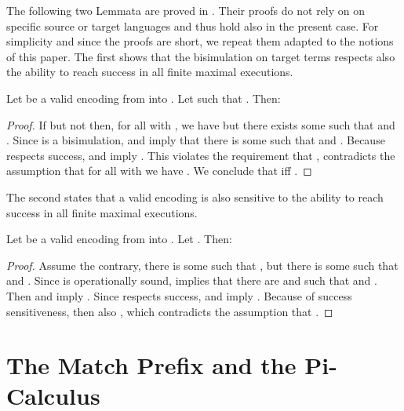 \documentclass[]{article}
\begin{document}
The following two Lemmata are proved in \cite{petphd}. Their proofs do not rely on on specific source or target languages and thus hold also in the present case. For simplicity and since the proofs are short, we repeat them adapted to the notions of this paper. The first shows that the bisimulation  on target terms respects also the ability to reach success in all finite maximal executions.

\begin{lemma}
	\label{lem:mustSuccessRespecting}
	Let \encod be a valid encoding from \piT into \piNM.
	Let  such that .
	Then:
	
\end{lemma}

\begin{proof}
	If  but not  then, for all  with , we have  but there exists some  such that  and .
	Since  is a bisimulation,  and  imply that there is some  such that  and .
	Because  respects success,  and  imply .
	This violates the requirement that , \ie contradicts the assumption that for all  with  we have .
	We conclude that  iff .
\end{proof}

The second states that a valid encoding is also sensitive to the ability to reach success in all finite maximal executions.

\begin{lemma}
	\label{lem:mustSuccessSensitiveness}
	Let \encod be a valid encoding from \piT into \piNM.
	Let .
	Then:
	
\end{lemma}

\begin{proof}
	Assume the contrary, \ie there is some  such that , but there is some  such that  and .
	Since  is operationally sound,  implies that there are  and  such that  and . Then  and  imply . Since  respects success,  and  imply . Because of success sensitiveness, then also , which contradicts the assumption that .
\end{proof}



\section{The Match Prefix and the Pi-Calculus}
\label{sec:encodeMatch}
\end{document}
